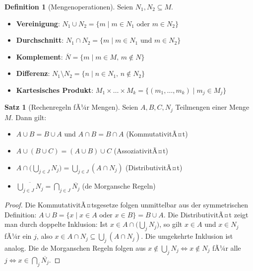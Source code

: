 ﻿\documentclass[a4paper,12pt]{report}
\theoremstyle{definition}
\newtheorem{definition}{Definition}
\newtheorem{satz}{Satz}
\begin{document}
\begin{definition}[Mengenoperationen]
    Seien $N_1, N_2 \subseteq M$.
    \begin{itemize}
        \item[-] \textbf{Vereinigung}: $N_1 \cup N_2 = \{m \mid m \in N_1
              \text{ oder } m \in N_2\}$
        \item[-] \textbf{Durchschnitt}: $N_1 \cap N_2 = \{m \mid m \in N_1
              \text{ und } m \in N_2\}$
        \item[-] \textbf{Komplement}: $\overline{N} = \{m \mid m \in M,\, m \notin N\}$
        \item[-] \textbf{Differenz}: $N_1 \setminus N_2 = \{n \mid n \in N_1,\,
              n \notin N_2\}$
        \item[-] \textbf{Kartesisches Produkt}: $M_1 \times \dots \times M_k =
              \{(m_1,\dots,m_k) \mid m_j \in M_j\}$
    \end{itemize}
\end{definition}

\begin{satz}[Rechenregeln fÃ¼r Mengen]
    Seien $A, B, C, N_j$ Teilmengen einer Menge $M$. Dann gilt:
    \begin{itemize}
        \item[-] $A \cup B = B \cup A$ und $A \cap B = B \cap A$ \quad (KommutativitÃ¤t)
        \item[-] $A \cup (B \cup C) = (A \cup B) \cup C$ \quad (AssoziativitÃ¤t)
        \item[-] $A \cap \bigl(\bigcup_{j \in J} N_j\bigr) = \bigcup_{j \in J}
              (A \cap N_j)$ \quad (DistributivitÃ¤t)
        \item[-] $\overline{\bigcup_{j \in J} N_j} = \bigcap_{j \in J} \overline{N_j}$
              \quad (de Morgansche Regeln)
    \end{itemize}
\end{satz}
\begin{proof}
    Die KommutativitÃ¤tsgesetze folgen unmittelbar aus der symmetrischen Definition:
    $A \cup B = \{x \mid x \in A \text{ oder } x \in B\} = B \cup A$.
    Die DistributivitÃ¤t zeigt man durch doppelte Inklusion:
    Ist $x \in A \cap \bigl(\bigcup_j N_j\bigr)$, so gilt $x \in A$ und $x \in N_j$
    fÃ¼r ein $j$, also $x \in A \cap N_j \subseteq \bigcup_j (A \cap N_j)$.
    Die umgekehrte Inklusion ist analog. Die de Morganschen Regeln folgen aus
    $x \notin \bigcup_j N_j \Leftrightarrow x \notin N_j$ fÃ¼r alle $j
    \Leftrightarrow x \in \bigcap_j \overline{N_j}$.
\end{proof}
\end{document}
